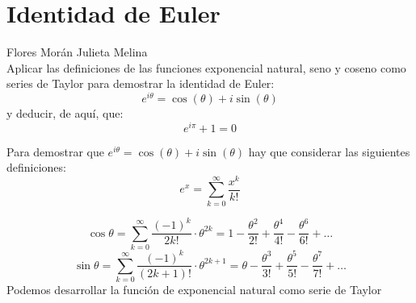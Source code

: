 \documentclass[12pt]{article}
\begin{document}
\section{Identidad de Euler} Flores Morán Julieta Melina \\

Aplicar las definiciones de las funciones exponencial natural, seno y coseno como series de Taylor para demostrar la identidad de Euler:
\[e^{i\theta} = \cos(\theta) + i \sin(\theta)\]
y deducir, de aquí, que:
\[e^{i\pi} + 1 = 0\]

Para demostrar que $e^{i\theta} = \cos(\theta) + i \sin(\theta)$ hay que considerar las siguientes definiciones:
\[
e^x = \sum_{k=0}^{\infty}\frac{x^{k}}{k!}
\]

\[
\cos\theta = \sum_{k=0}^{\infty}\frac{(-1)^{k}}{2k!} \cdot \theta ^{2k} = 1- \frac{\theta^2}{2!} + \frac{\theta ^4}{4!} -   \frac{\theta^6}{6!} + \ldots
\]
\[
\sin\theta = \sum_{k=0}^{\infty}\frac{(-1)^{k}}{(2k+1)!} \cdot \theta ^{2k+1} =  \theta - \frac{\theta^3}{3!} + \frac{\theta ^5}{5!} -   \frac{\theta^7}{7!} + \ldots
\]
Podemos desarrollar la función de exponencial natural como serie de Taylor
\end{document}
